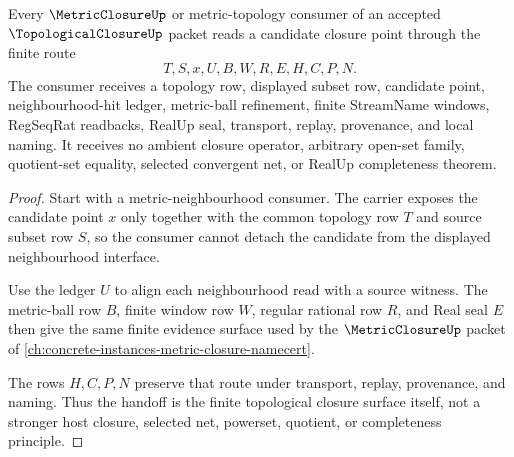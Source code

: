 \begin{theorem}
\label{thm:topological-closure-metric-neighbourhood-route}
Every $\MetricClosureUp$ or metric-topology consumer of an accepted $\TopologicalClosureUp$ packet reads a candidate closure point through the finite route
$$
T,S,x,U,B,W,R,E,H,C,P,N.
$$
The consumer receives a topology row, displayed subset row, candidate point, neighbourhood-hit ledger, metric-ball refinement, finite StreamName windows, RegSeqRat readbacks, RealUp seal, transport, replay, provenance, and local naming. It receives no ambient closure operator, arbitrary open-set family, quotient-set equality, selected convergent net, or RealUp completeness theorem.
\end{theorem}
\begin{proof}
Start with a metric-neighbourhood consumer. The carrier exposes the candidate point $x$ only together with the common topology row $T$ and source subset row $S$, so the consumer cannot detach the candidate from the displayed neighbourhood interface.

Use the ledger $U$ to align each neighbourhood read with a source witness. The metric-ball row $B$, finite window row $W$, regular rational row $R$, and Real seal $E$ then give the same finite evidence surface used by the $\MetricClosureUp$ packet of \autoref{ch:concrete-instances-metric-closure-namecert}.

The rows $H,C,P,N$ preserve that route under transport, replay, provenance, and naming. Thus the handoff is the finite topological closure surface itself, not a stronger host closure, selected net, powerset, quotient, or completeness principle.
\end{proof}



